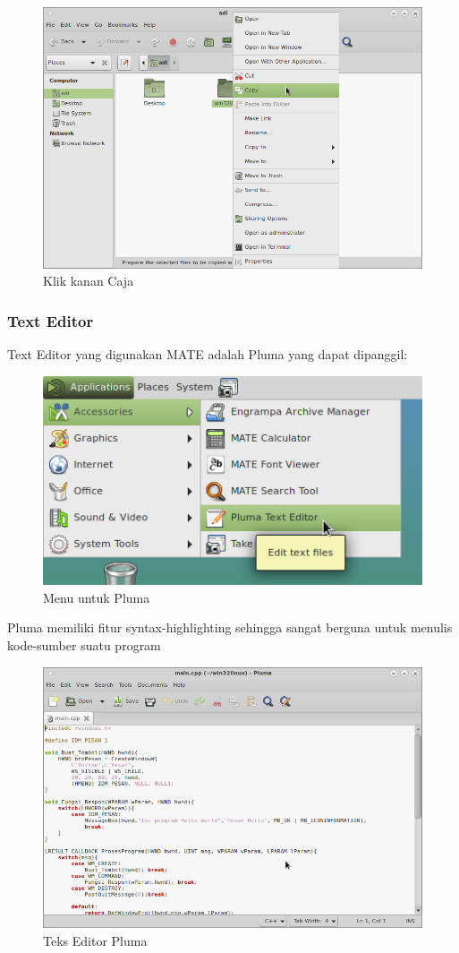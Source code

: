 \documentclass[12pt,]{article}
\begin{document}
	\begin{figure}[H]
		\centering
		\includegraphics[width=0.8\linewidth]{images/mateapp/caja4}
		\caption{Klik kanan Caja}
	\end{figure}

	\newpage
	\subsubsection{Text Editor}
	Text Editor yang digunakan MATE adalah Pluma yang dapat dipanggil:
	\begin{figure}[H]
		\centering
		\includegraphics[width=0.5\linewidth]{images/mateapp/pluma1}
		\caption{Menu untuk Pluma}
	\end{figure} 
	Pluma memiliki fitur syntax-highlighting sehingga sangat berguna untuk menulis kode-sumber suatu program
	\begin{figure}[H]
		\centering
		\includegraphics[width=0.8\linewidth]{images/mateapp/pluma2}
		\caption{Teks Editor Pluma}
	\end{figure}
\end{document}
